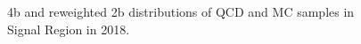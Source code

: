 \begin{figure}[ht]
 

    \caption{4b and reweighted 2b distributions of QCD and \ttbar MC samples in Signal Region in 2018.}
    \label{fig:data-weights-4b-SR-2018}
\end{figure}


